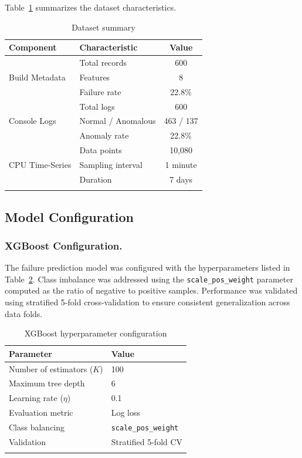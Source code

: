 \documentclass[sn-nature]{sn-jnl}
\theoremstyle{thmstyleone}
\theoremstyle{thmstyletwo}
\theoremstyle{thmstylethree}
\begin{document}
Table~\ref{tab:dataset} summarizes the dataset characteristics.

\begin{table}[htbp]
\caption{Dataset summary}\label{tab:dataset}
\begin{tabular}{@{}llc@{}}
\toprule
\textbf{Component} & \textbf{Characteristic} & \textbf{Value} \\
\midrule
\multirow{3}{*}{Build Metadata} & Total records & 600 \\
 & Features & 8 \\
 & Failure rate & 22.8\% \\
\midrule
\multirow{3}{*}{Console Logs} & Total logs & 600 \\
 & Normal / Anomalous & 463 / 137 \\
 & Anomaly rate & 22.8\% \\
\midrule
\multirow{3}{*}{CPU Time-Series} & Data points & 10,080 \\
 & Sampling interval & 1 minute \\
 & Duration & 7 days \\
\botrule
\end{tabular}
\end{table}

\subsection{Model Configuration}\label{subsec:modelconfig}

\subsubsection{XGBoost Configuration.}
The failure prediction model was configured with the hyperparameters listed in Table~\ref{tab:xgbconfig}. Class imbalance was addressed using the \texttt{scale\_pos\_weight} parameter computed as the ratio of negative to positive samples. Performance was validated using stratified 5-fold cross-validation to ensure consistent generalization across data folds.

\begin{table}[htbp]
\caption{XGBoost hyperparameter configuration}\label{tab:xgbconfig}
\begin{tabular}{@{}ll@{}}
\toprule
\textbf{Parameter} & \textbf{Value} \\
\midrule
Number of estimators ($K$) & 100 \\
Maximum tree depth & 6 \\
Learning rate ($\eta$) & 0.1 \\
Evaluation metric & Log loss \\
Class balancing & \texttt{scale\_pos\_weight} \\
Validation & Stratified 5-fold CV \\
\botrule
\end{tabular}
\end{table}
\end{document}
